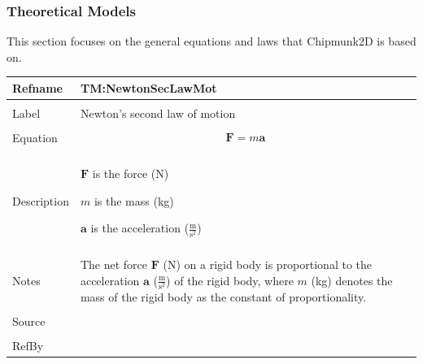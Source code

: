 \documentclass[12pt]{article}
\begin{document}
\subsubsection{Theoretical Models}
\label{Sec:TMs}
This section focuses on the general equations and laws that Chipmunk2D is based on.
~\newline
 \noindent \begin{minipage}{\textwidth}
\begin{tabular}{p{} p{}}
\toprule \textbf{Refname} & \textbf{TM:NewtonSecLawMot}
\label{TM:NewtonSecLawMot}
\\ \midrule \\
Label & Newton's second law of motion
        \\ \midrule \\
        Equation & \begin{displaymath}
                   \mathbf{F}=m \mathbf{a}
                   \end{displaymath}
                   \\ \midrule \\
                   Description & \begin{symbDescription}
                                 \item{$\mathbf{F}$ is the force (N)}
                                 \item{$m$ is the mass (kg)}
                                 \item{$\mathbf{a}$ is the acceleration ($\frac{\text{m}}{\text{s}^{2}}$)}
                                 \end{symbDescription}
                                 \\ \midrule \\
                                 Notes & The net force $\mathbf{F}$ (N) on a rigid body is proportional to the acceleration $\mathbf{a}$ ($\frac{\text{m}}{\text{s}^{2}}$) of the rigid body, where $m$ (kg) denotes the mass of the rigid body as the constant of proportionality.
                                         \\ \midrule \\
                                         Source & \\ \midrule \\
                                                  RefBy & 
\\ \bottomrule \end{tabular}
\end{minipage}\\
\end{document}
